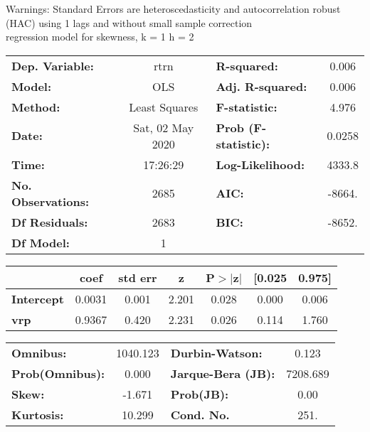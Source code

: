 Warnings: \newline
 [1] Standard Errors are heteroscedasticity and autocorrelation robust (HAC) using 1 lags and without small sample correction\\ 

regression model for skewness, k = 1 h = 2\begin{center}
\begin{tabular}{lclc}
\toprule
\textbf{Dep. Variable:}    &       rtrn       & \textbf{  R-squared:         } &     0.006   \\
\textbf{Model:}            &       OLS        & \textbf{  Adj. R-squared:    } &     0.006   \\
\textbf{Method:}           &  Least Squares   & \textbf{  F-statistic:       } &     4.976   \\
\textbf{Date:}             & Sat, 02 May 2020 & \textbf{  Prob (F-statistic):} &   0.0258    \\
\textbf{Time:}             &     17:26:29     & \textbf{  Log-Likelihood:    } &    4333.8   \\
\textbf{No. Observations:} &        2685      & \textbf{  AIC:               } &    -8664.   \\
\textbf{Df Residuals:}     &        2683      & \textbf{  BIC:               } &    -8652.   \\
\textbf{Df Model:}         &           1      & \textbf{                     } &             \\
\bottomrule
\end{tabular}
\begin{tabular}{lcccccc}
                   & \textbf{coef} & \textbf{std err} & \textbf{z} & \textbf{P$> |$z$|$} & \textbf{[0.025} & \textbf{0.975]}  \\
\midrule
\textbf{Intercept} &       0.0031  &        0.001     &     2.201  &         0.028        &        0.000    &        0.006     \\
\textbf{vrp}       &       0.9367  &        0.420     &     2.231  &         0.026        &        0.114    &        1.760     \\
\bottomrule
\end{tabular}
\begin{tabular}{lclc}
\textbf{Omnibus:}       & 1040.123 & \textbf{  Durbin-Watson:     } &    0.123  \\
\textbf{Prob(Omnibus):} &   0.000  & \textbf{  Jarque-Bera (JB):  } & 7208.689  \\
\textbf{Skew:}          &  -1.671  & \textbf{  Prob(JB):          } &     0.00  \\
\textbf{Kurtosis:}      &  10.299  & \textbf{  Cond. No.          } &     251.  \\
\bottomrule
\end{tabular}
\end{center}

